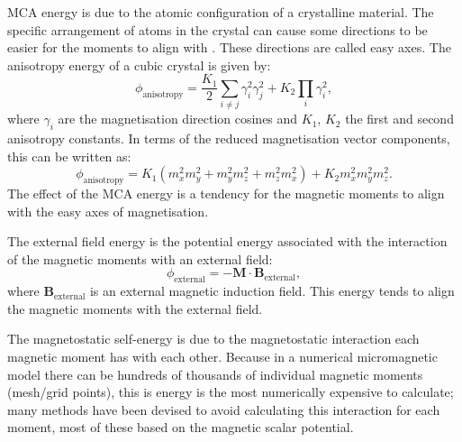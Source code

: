 MCA energy is due to the atomic configuration of a crystalline material. The specific arrangement of atoms in the crystal can cause some directions to be easier for the moments to align with \citep{Kittel1949}. These directions are called easy axes. The anisotropy energy of a cubic crystal is given by:
\begin{equation}
\phi_{\text{anisotropy}}=\frac{K_1}{2}\sum_{i\neq j}\gamma_i^2\gamma_j^2 + K_2\prod_i\gamma_i^2,
\end{equation}
where $\gamma_i$ are the magnetisation direction cosines and $K_1$, $K_2$ the first and second anisotropy constants. In terms of the reduced magnetisation vector components, this can be written as:
\begin{equation}
\phi_{\text{anisotropy}}=K_1(m_x^2m_y^2+m_y^2m_z^2+m_z^2m_x^2) + K_2m_x^2m_y^2m_z^2.
\end{equation}
The effect of the MCA energy is a tendency for the magnetic moments to align with the easy axes of magnetisation.\par

The external field energy is the potential energy associated with the interaction of the magnetic moments with an external field:
\begin{equation}
\phi_{\text{external}} = -\boldsymbol{M} \cdot \boldsymbol{B}_{\text{external}},
\end{equation}
where $\boldsymbol{B}_{\text{external}}$ is an external magnetic induction field. This energy tends to align the magnetic moments with the external field.\par

The magnetostatic self-energy is due to the magnetostatic interaction each magnetic moment has with each other. Because in a numerical micromagnetic model there can be hundreds of thousands of individual magnetic moments (mesh/grid points), this is energy is the most numerically expensive to calculate; many methods have been devised to avoid calculating this interaction for each moment, most of these based on the magnetic scalar potential.\par

